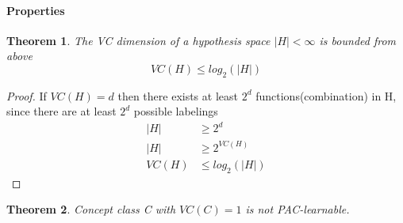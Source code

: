 \documentclass[main.tex]{subfiles}
\newtheorem{theorem}{Theorem}[section] %
\begin{document}
\paragraph{Properties}
\begin{theorem}
    The VC dimension of a hypothesis space $|H| < \infty$ is bounded from above
    \begin{equation*}
        VC(H) \leq log_2(|H|)
    \end{equation*}
\end{theorem}
\begin{proof}
    If $VC(H)=d$ then there exists at least $2^d$ functions(combination) in H, since there are at least $2^d$ possible labelings
    \begin{align*}
        |H|   & \geq 2^d        \\
        |H|   & \geq 2^{VC(H)}  \\
        VC(H) & \leq log_2(|H|)
    \end{align*}
\end{proof}
\begin{theorem}
    Concept class C with $VC(C) = 1$ is not PAC-learnable.
\end{theorem}

\newpage
\end{document}
